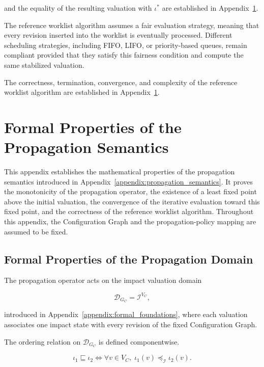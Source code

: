 \documentclass[10pt]{article}
\begin{document}
and the equality of the resulting valuation with $\iota^{*}$ are established in Appendix~\ref{appendix:formal_properties}.

The reference worklist algorithm assumes a fair evaluation strategy, meaning that every revision inserted into the worklist is eventually processed.
Different scheduling strategies, including FIFO, LIFO, or priority-based queues, remain compliant provided that they satisfy this fairness condition and compute the same stabilized valuation.

The correctness, termination, convergence, and complexity of the reference worklist algorithm are established in Appendix~\ref{appendix:formal_properties}.

\section{Formal Properties of the Propagation Semantics}
\label{appendix:formal_properties}

This appendix establishes the mathematical properties of the propagation
semantics introduced in Appendix~\ref{appendix:propagation_semantics}. It proves
the monotonicity of the propagation operator, the existence of a least fixed
point above the initial valuation, the convergence of the iterative evaluation
toward this fixed point, and the correctness of the reference worklist
algorithm. Throughout this appendix, the Configuration Graph and the
propagation-policy mapping are assumed to be fixed.

\subsection{Formal Properties of the Propagation Domain}
\label{appendix:finite_lattice}
The propagation operator acts on the impact valuation domain

\[
\mathcal D_{G_C}
=
\mathcal I^{V_C},
\]

introduced in Appendix~\ref{appendix:formal_foundations}, where each valuation associates one impact state with every revision of the fixed Configuration
Graph.

The ordering relation on $\mathcal D_{G_C}$ is defined componentwise.

\begin{equation}
	\label{eq:product_order}
	\iota_1
	\sqsubseteq
	\iota_2
	\iff
	\forall v\in V_C,\;
	\iota_1(v)
	\preceq_{\mathcal I}
	\iota_2(v).
\end{equation}
\end{document}
